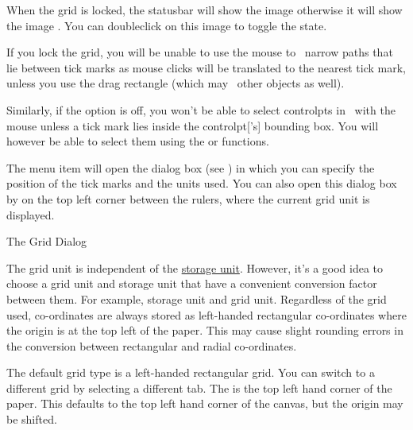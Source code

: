 When the grid is locked, the \gls{statusbar} will show the image
 otherwise it will show
the image .
You can \gls{doubleclick} on this image to toggle the state.

\begin{warning}
If you lock the grid, you will be unable to use the
mouse to \select\ narrow \glspl{path} that lie between tick marks as
mouse \glspl{click} will be translated to the nearest tick mark, unless you
use the drag rectangle (which may \select\ other \glspl{object} as well).
\end{warning}

Similarly, if the 
option is off, you won't be able to select \glspl{controlpt} in
\editpathmode\ with the mouse unless a
tick mark lies inside the \gls{controlpt}['s] bounding box.
You will however be able to select them using the
or  functions.


The  menu item will open the
 dialog box (see ) in which
you can specify the position of the tick marks and the units used.
You can also open this dialog box by
 on the top left corner
between the \glspl{ruler}, where the current grid unit is displayed.

{}
{The Grid Dialog}

\begin{important}
The grid unit is independent of the 
\hyperref[sec:controlsettings]{storage unit}.  However, it's a good idea to choose a
grid unit and storage unit that have a convenient conversion factor
between them. For example,  storage unit and 
grid unit. Regardless of the grid used, co-ordinates are always
stored as left-handed rectangular co-ordinates where the \gls{origin} is
at the top left of the paper. This may cause slight rounding errors in the
conversion between rectangular and radial co-ordinates.
\end{important}


The default grid type is a left-handed rectangular grid. You can
switch to a different grid by selecting a different tab.
The  is the top left hand corner of the paper.
This defaults to the top left hand corner of the \gls{canvas}, but
the \gls{origin} may be shifted.


